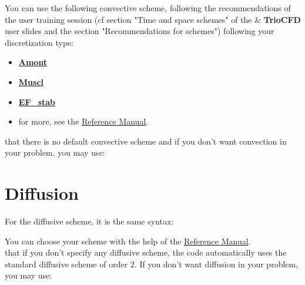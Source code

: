 You can use the following convective scheme, following the recommendations of the user training session (cf section "Time and space schemes" of the \trust \& \textbf{TrioCFD} user slides and the section "Recommendations for schemes") following your discretization type:
\begin{itemize}
\item \href{\REFERENCEMANUAL\#convectionamont}{\textbf{Amont}}
\item \href{\REFERENCEMANUAL\#convectionmuscl}{\textbf{Muscl}}
\item \href{\REFERENCEMANUAL\#convectionefstab}{\textbf{EF\_stab}}
\item for more, see the \href{\REFERENCEMANUAL\#blocconvection}{\trustref Reference Manual}.
\end{itemize}

\Note that there is no default convective scheme and if you don't want convection in your problem, you may use:

    \begin{center}
    \end{center}

\section{Diffusion}
For the diffusive scheme, it is the same syntax:

    \begin{center}
    \end{center}

You can choose your scheme with the help of the \href{\REFERENCEMANUAL\#blocdiffusion}{\trustref Reference Manual}.\\

\Note that if you don't specify any diffusive scheme, the code automatically uses the standard diffusive scheme of order 2.
If you don't want diffusion in your problem, you may use:

